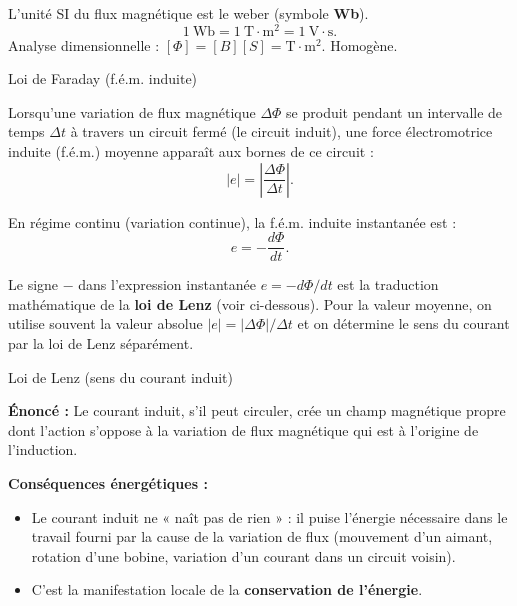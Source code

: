 \documentclass[11pt]{article}
\newcommand{\cle}[1]{{\popxbold\color{popdark}#1}}
\begin{document}
\begin{aretenir}
L'unité SI du flux magnétique est le \cle{weber} (symbole \textbf{Wb}).
\[ 1~\text{Wb} = 1~\text{T}\cdot\text{m}^2 = 1~\text{V}\cdot\text{s}. \]
Analyse dimensionnelle : $[\Phi] = [B][S] = \text{T}\cdot\text{m}^2$. Homogène.
\end{aretenir}

\begin{propriete}Loi de Faraday (f.é.m. induite)\end{propriete}

Lorsqu'une variation de flux magnétique $\Delta\Phi$ se produit pendant un intervalle de temps $\Delta t$ à travers un circuit fermé (le circuit induit), une \cle{force électromotrice induite} (f.é.m.) moyenne apparaît aux bornes de ce circuit :
\[ |e| = \left|\frac{\Delta\Phi}{\Delta t}\right|. \]

En régime continu (variation continue), la f.é.m. induite instantanée est :
\[ e = -\frac{d\Phi}{dt}. \]

\begin{attention}
Le signe $-$ dans l'expression instantanée $e = -d\Phi/dt$ est la traduction mathématique de la \textbf{loi de Lenz} (voir ci-dessous). Pour la valeur moyenne, on utilise souvent la valeur absolue $|e| = |\Delta\Phi|/\Delta t$ et on détermine le sens du courant par la loi de Lenz séparément.
\end{attention}

\begin{propriete}Loi de Lenz (sens du courant induit)\end{propriete}

\textbf{Énoncé :} Le courant induit, s'il peut circuler, crée un champ magnétique propre dont l'action s'oppose à la variation de flux magnétique qui est à l'origine de l'induction.

\textbf{Conséquences énergétiques :}
\begin{itemize}
\item Le courant induit ne « naît pas de rien » : il puise l'énergie nécessaire dans le travail fourni par la cause de la variation de flux (mouvement d'un aimant, rotation d'une bobine, variation d'un courant dans un circuit voisin).
\item C'est la manifestation locale de la \textbf{conservation de l'énergie}.
\end{itemize}
\end{document}
